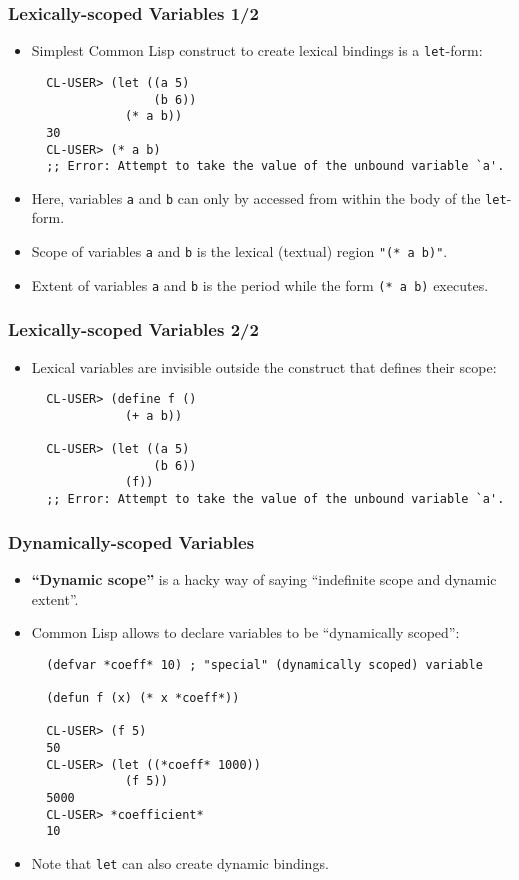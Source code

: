 \documentclass{beamer}
\begin{document}
\begin{frame}[fragile]
  \frametitle{Lexically-scoped Variables 1/2}
  \begin{itemize}
  \item Simplest Common Lisp construct to create lexical bindings is
    a \texttt{let}-form:
\begin{verbatim}
  CL-USER> (let ((a 5)
                 (b 6))
             (* a b))
  30
  CL-USER> (* a b)
  ;; Error: Attempt to take the value of the unbound variable `a'.
\end{verbatim}
  \item Here, variables \texttt{a} and \texttt{b} can only
    by accessed from within the body of the \texttt{let}-form.
  \item Scope of variables \texttt{a} and \texttt{b} is the
    lexical (textual) region \texttt{"(* a b)"}.
  \item Extent of variables \texttt{a} and \texttt{b} is the
    period while the form \texttt{(* a b)} executes.
  \end{itemize}
\end{frame}

\begin{frame}[fragile]
  \frametitle{Lexically-scoped Variables 2/2}
  \begin{itemize}
  \item Lexical variables are invisible outside the construct that defines their
    scope:
\begin{verbatim}
  CL-USER> (define f ()
             (+ a b))

  CL-USER> (let ((a 5)
                 (b 6))
             (f))
  ;; Error: Attempt to take the value of the unbound variable `a'.
\end{verbatim}
  \end{itemize}
\end{frame}

\begin{frame}[fragile]
  \frametitle{Dynamically-scoped Variables}
  \begin{itemize}
  \item \textbf{``Dynamic scope''} is a hacky way of saying ``indefinite scope
    and dynamic extent''.
  \item Common Lisp allows to declare variables to be ``dynamically scoped'':
\begin{verbatim}
  (defvar *coeff* 10) ; "special" (dynamically scoped) variable 

  (defun f (x) (* x *coeff*))

  CL-USER> (f 5)
  50
  CL-USER> (let ((*coeff* 1000))
             (f 5))
  5000
  CL-USER> *coefficient*
  10
\end{verbatim}
  \item Note that \texttt{let} can also create dynamic bindings.
  \end{itemize}
\end{frame}
\end{document}
